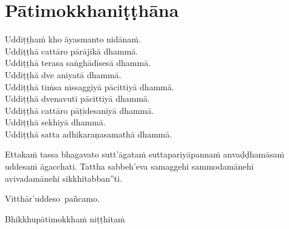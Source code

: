 \section{Pātimokkhaniṭṭhāna}
\label{patimokkhanitthana}

Uddiṭṭhaṁ kho āyasmanto nidānaṁ.\\
Uddiṭṭhā cattāro pārājikā dhammā.\\
Uddiṭṭhā terasa saṅghādisesā dhammā.\\
Uddiṭṭhā dve aniyatā dhammā.\\
Uddiṭṭhā tiṁsa nissaggiyā pācittiyā dhammā.\\
Uddiṭṭhā dvenavuti pācittiyā dhammā.\\
Uddiṭṭhā cattāro pāṭidesanīyā dhammā.\\
Uddiṭṭhā sekhiyā dhammā.\\
Uddiṭṭhā satta adhikaraṇasamathā dhammā.

Ettakaṁ tassa bhagavato sutt'āgataṁ suttapariyāpannaṁ anvaḍḍhamāsaṁ uddesaṁ āgacchati. Tattha sabbeh'eva samaggehi sammodamānehi avivadamānehi sikkhitabban''ti.

Vitthār'uddeso pañcamo.

\begin{outro}
  Bhikkhupātimokkhaṁ niṭṭhitaṁ
\end{outro}

\clearpage
